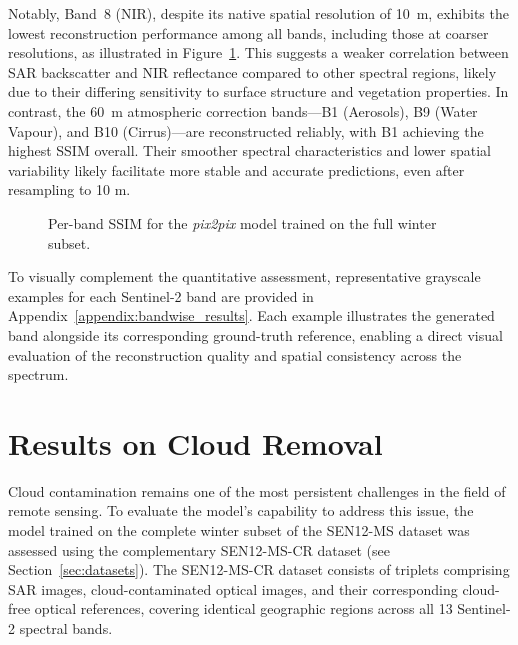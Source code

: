 Notably, Band~8 (NIR), despite its native spatial resolution of 10~m, exhibits the lowest reconstruction performance among all bands, including those at coarser resolutions, as illustrated in Figure~\ref{fig:ssim_per_band}. This suggests a weaker correlation between SAR backscatter and NIR reflectance compared to other spectral regions, likely due to their differing sensitivity to surface structure and vegetation properties. In contrast, the 60~m atmospheric correction bands—B1 (Aerosols), B9 (Water Vapour), and B10 (Cirrus)—are reconstructed reliably, with B1 achieving the highest SSIM overall. Their smoother spectral characteristics and lower spatial variability likely facilitate more stable and accurate predictions, even after resampling to 10 m.

\begin{figure}[h!]
\centering
{}
\caption[Per-band SSIM for the Pix2Pix model]{Per-band SSIM for the \textit{pix2pix} model trained on the full winter subset.}
\label{fig:ssim_per_band}
\end{figure}

To visually complement the quantitative assessment, representative grayscale examples for each Sentinel-2 band are provided in Appendix~\ref{appendix:bandwise_results}. Each example illustrates the generated band alongside its corresponding ground-truth reference, enabling a direct visual evaluation of the reconstruction quality and spatial consistency across the spectrum.

\newpage

\section{Results on Cloud Removal}
Cloud contamination remains one of the most persistent challenges in the field of remote sensing. To evaluate the model’s capability to address this issue, the model trained on the complete winter subset of the SEN12-MS dataset was assessed using the complementary SEN12-MS-CR dataset (see Section~\ref{sec:datasets}). The SEN12-MS-CR dataset consists of triplets comprising SAR images, cloud-contaminated optical images, and their corresponding cloud-free optical references, covering identical geographic regions across all 13 Sentinel-2 spectral bands.

